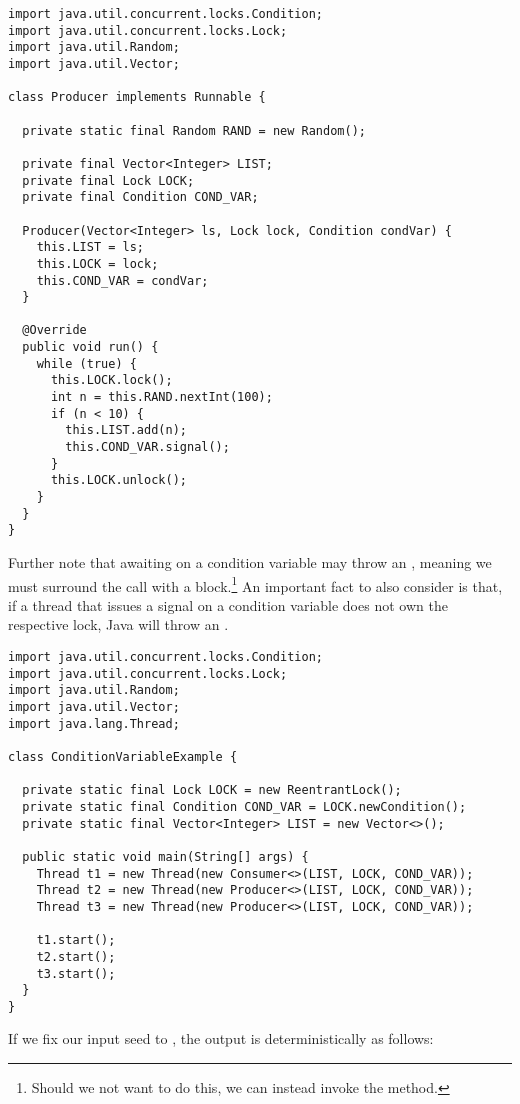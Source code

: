 \begin{lstlisting}[language=MyJava]
import java.util.concurrent.locks.Condition;
import java.util.concurrent.locks.Lock;
import java.util.Random;
import java.util.Vector;

class Producer implements Runnable {

  private static final Random RAND = new Random();

  private final Vector<Integer> LIST;
  private final Lock LOCK;
  private final Condition COND_VAR;

  Producer(Vector<Integer> ls, Lock lock, Condition condVar) {
    this.LIST = ls;
    this.LOCK = lock;
    this.COND_VAR = condVar;
  }

  @Override
  public void run() {
    while (true) {
      this.LOCK.lock();
      int n = this.RAND.nextInt(100);
      if (n < 10) {
        this.LIST.add(n);
        this.COND_VAR.signal();
      }
      this.LOCK.unlock();
    }
  }
}
\end{lstlisting}

Further note that awaiting on a condition variable may throw an , meaning we must surround the call with a  block.\footnote{Should we not want to do this, we can instead invoke the  method.} An important fact to also consider is that, if a thread that issues a signal on a condition variable does not own the respective lock, Java will throw an .

\begin{lstlisting}[language=MyJava]
import java.util.concurrent.locks.Condition;
import java.util.concurrent.locks.Lock;
import java.util.Random;
import java.util.Vector;
import java.lang.Thread;

class ConditionVariableExample {

  private static final Lock LOCK = new ReentrantLock();
  private static final Condition COND_VAR = LOCK.newCondition();
  private static final Vector<Integer> LIST = new Vector<>();

  public static void main(String[] args) {
    Thread t1 = new Thread(new Consumer<>(LIST, LOCK, COND_VAR));
    Thread t2 = new Thread(new Producer<>(LIST, LOCK, COND_VAR));
    Thread t3 = new Thread(new Producer<>(LIST, LOCK, COND_VAR));

    t1.start();
    t2.start();
    t3.start();
  }
}
\end{lstlisting}

If we fix our input seed to , the output is deterministically as follows:

